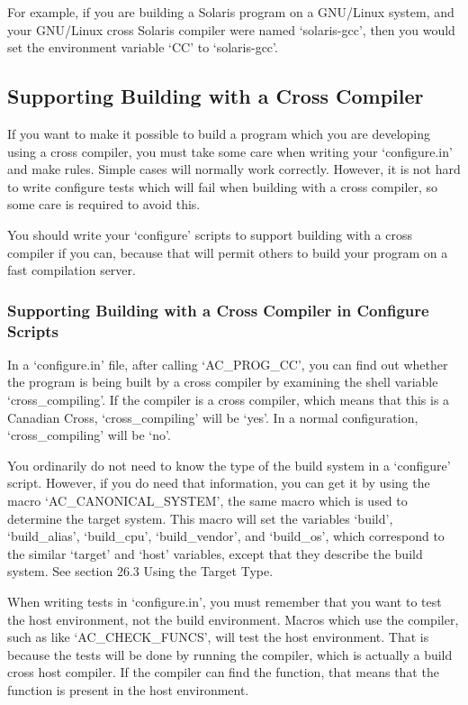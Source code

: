For example, if you are building a Solaris program on a GNU/Linux system, and your GNU/Linux cross Solaris compiler were named `solaris-gcc', then you would set the environment variable `CC' to `solaris-gcc'. 

\subsection{Supporting Building with a Cross Compiler}

If you want to make it possible to build a program which you are developing using a cross compiler, you must take some care when writing your `configure.in' and make rules. Simple cases will normally work correctly. However, it is not hard to write configure tests which will fail when building with a cross compiler, so some care is required to avoid this.

You should write your `configure' scripts to support building with a cross compiler if you can, because that will permit others to build your program on a fast compilation server. 

\subsubsection[in Configure Scripts]{Supporting Building with a Cross Compiler in Configure Scripts}

In a `configure.in' file, after calling `AC\_{}PROG\_{}CC', you can find out 
whether the program is being built by a cross compiler by examining the shell 
variable `cross\_{}compiling'. If the compiler is a cross compiler, which 
means that this is a Canadian Cross, `cross\_{}compiling' will be `yes'. In a normal configuration, `cross\_{}compiling' will be `no'.

You ordinarily do not need to know the type of the build system in a `configure' script. However, if you do need that information, you can get it by using the macro `AC\_{}CANONICAL\_{}SYSTEM', the same macro which is used to determine the target system. This macro will set the variables `build', `build\_{}alias', `build\_{}cpu', `build\_{}vendor', and `build\_{}os', which correspond to the similar `target' and `host' variables, except that they describe the build system. See section 26.3 Using the Target Type.

When writing tests in `configure.in', you must remember that you want to test the host environment, not the build environment. Macros which use the compiler, such as like `AC\_{}CHECK\_{}FUNCS', will test the host environment. That is because the tests will be done by running the compiler, which is actually a build cross host compiler. If the compiler can find the function, that means that the function is present in the host environment.

